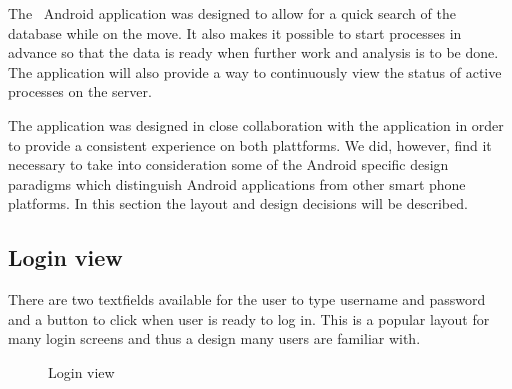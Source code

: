 


The \appName\ Android application was designed to allow for a quick search of the database while on the move. It also makes it possible to start processes in advance so that the data is ready when further work and analysis is to be done. The application will also provide a way to continuously view the status of active processes on the server. 

The application was designed in close collaboration with the  application in order to provide a consistent experience on both plattforms.  We did, however, find it necessary to take into consideration some of the Android specific design paradigms which distinguish Android applications from other smart phone platforms. In this section the layout and design decisions will be described.


\subsection{Login view}
There are two textfields available for the user to type username and password and a button to click when user is ready to log in.
This is a popular layout for many login screens and thus a design many users are familiar with.


\begin{figure}[ht]
\caption{Login view}
\label{fig:and_login}
\end{figure}
\FloatBarrier

